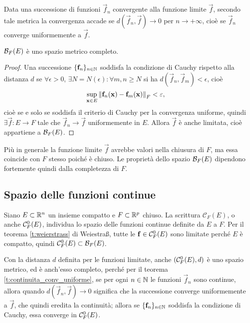 Data una successione di funzioni $\vec f_n$ convergente alla funzione limite $\vec f$, secondo tale metrica la convergenza accade se $d(\vec f_n,\vec f)\to 0$ per $n\to+\infty$, cioè se $\vec f_n$ converge uniformemente a $\vec f$.
\begin{teorema}
$\mathcal{B}_{F}({E})$ è uno spazio metrico completo.
\end{teorema}
\begin{proof}
Una successione $\{\mathbf{f}_n\}_{n\in\mathbb{N}}$ soddisfa la condizione di Cauchy rispetto alla distanza $d$ se $\forall\epsilon>0$, $\exists N=N(\epsilon)\colon\forall m,n\geq N$ si ha $d(\vec f_n,\vec f_m)<\epsilon$, cioè
\[
\sup_{\mathbf{x}\in E}\left\|{\mathbf{f}_n(\mathbf{x})-\mathbf{f}_m(\mathbf{x})}\right\|_F<\varepsilon,
\]
cioè se e solo se soddisfa il criterio di Cauchy per la convergenza uniforme, quindi $\exists\vec f\colon E\to F$ tale che $\vec f_n\to \vec f$ uniformemente in $E$. Allora $\vec f$ è anche limitata, cioè appartiene a $\mathcal{B}_{F}({E})$.
\end{proof}
Più in generale la funzione limite $\vec f$ avrebbe valori nella chiusura di $F$, ma essa coincide con $F$ stesso poiché è chiuso. Le proprietà dello spazio $\mathcal{B}_{F}({E})$ dipendono fortemente quindi dalla completezza di $F$.

\subsection*{Spazio delle funzioni continue}
Siano $E\subset\mathbb{R}^n$ un insieme compatto e $F\subset\mathbb{R}^p$ chiuso. La scrittura $\mathcal{C}_F(E)$, o anche $\mathcal{C}^{{0}}_F(E)$, individua lo spazio delle funzioni continue definite da $E$ a $F$.
Per il teorema \ref{t:weierstrass} di Weiestra\ss, tutte le $\mathbf{f}\in\mathcal{C}^{{0}}_F(E)$ sono limitate perché $E$ è compatto, quindi $\mathcal{C}^{{0}}_F(E)\subset\mathcal B_F(E)$.

Con la distanza $d$ definita per le funzioni limitate, anche $(\mathcal{C}^{{0}}_F(E),d)$ è uno spazio metrico, ed è anch'esso completo, perché per il teorema \ref{t:continuita_conv_uniforme}, se per ogni $n\in\mathbb{N}$ le funzioni $\vec f_n$ sono continue, allora quando $d(\vec f_n,\vec f)\to 0$ significa che la successione converge uniformemente a $\vec f$, che quindi eredita la continuità; allora se $\{\mathbf{f}_n\}_{n\in\mathbb{N}}$ soddisfa la condizione di Cauchy, essa converge in $\mathcal{C}^{{0}}_F(E)$.

